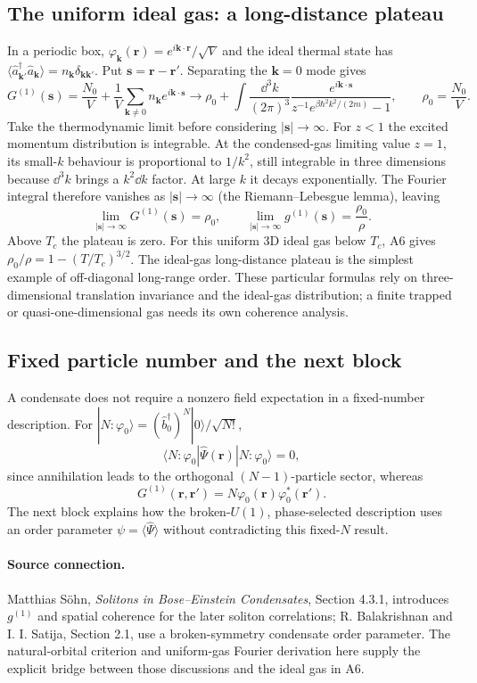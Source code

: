\subsection*{The uniform ideal gas: a long-distance plateau}
In a periodic box, $\varphi_{\mathbf k}(\mathbf r)=e^{i\mathbf k\cdot\mathbf r}/\sqrt V$ and the ideal thermal state has
$\langle\hat a^\dagger_{\mathbf k'}\hat a_{\mathbf k}\rangle
=n_{\mathbf k}\delta_{\mathbf k\mathbf k'}$. Put
$\mathbf s=\mathbf r-\mathbf r'$. Separating the $\mathbf k=0$ mode gives
\[
G^{(1)}(\mathbf s)
=\frac{N_0}{V}
+\frac1V\sum_{\mathbf k\ne0}n_{\mathbf k}e^{i\mathbf k\cdot\mathbf s}
\longrightarrow
\rho_0+\int\frac{\dd^3k}{(2\pi)^3}
\frac{e^{i\mathbf k\cdot\mathbf s}}
{z^{-1}e^{\beta\hbar^2k^2/(2m)}-1},
\qquad \rho_0=\frac{N_0}{V}.
\]
Take the thermodynamic limit before considering $|\mathbf s|\to\infty$.
For $z<1$ the excited momentum distribution is integrable. At the condensed-gas limiting value $z=1$, its small-$k$ behaviour is proportional to $1/k^2$, still integrable in three dimensions because $\dd^3k$ brings a $k^2\dd k$ factor. At large $k$ it decays exponentially. The Fourier integral therefore vanishes as $|\mathbf s|\to\infty$ (the Riemann--Lebesgue lemma), leaving
\[
\boxed{\lim_{|\mathbf s|\to\infty}G^{(1)}(\mathbf s)=\rho_0},
\qquad
\boxed{\lim_{|\mathbf s|\to\infty}g^{(1)}(\mathbf s)=\frac{\rho_0}{\rho}}.
\]
Above $T_c$ the plateau is zero. For this uniform 3D ideal gas below $T_c$, A6 gives
$\rho_0/\rho=1-(T/T_c)^{3/2}$. The ideal-gas long-distance plateau is the simplest example of off-diagonal long-range order. These particular formulas rely on three-dimensional translation invariance and the ideal-gas distribution; a finite trapped or quasi-one-dimensional gas needs its own coherence analysis.

\subsection*{Fixed particle number and the next block}
A condensate does not require a nonzero field expectation in a fixed-number description. For
$|N:\varphi_0\rangle=(\hat b_0^\dagger)^N|0\rangle/\sqrt{N!}$,
\[
\langle N:\varphi_0|\hat\Psi(\mathbf r)|N:\varphi_0\rangle=0,
\]
since annihilation leads to the orthogonal $(N-1)$-particle sector, whereas
\[
G^{(1)}(\mathbf r,\mathbf r')
=N\varphi_0(\mathbf r)\varphi_0^*(\mathbf r').
\]
The next block explains how the broken-$U(1)$, phase-selected description uses an order parameter $\psi=\langle\hat\Psi\rangle$ without contradicting this fixed-$N$ result.

\paragraph{Source connection.}
Matthias S\"ohn, \emph{Solitons in Bose--Einstein Condensates}, Section 4.3.1, introduces $g^{(1)}$ and spatial coherence for the later soliton correlations; R. Balakrishnan and I. I. Satija, Section 2.1, use a broken-symmetry condensate order parameter. The natural-orbital criterion and uniform-gas Fourier derivation here supply the explicit bridge between those discussions and the ideal gas in A6.
